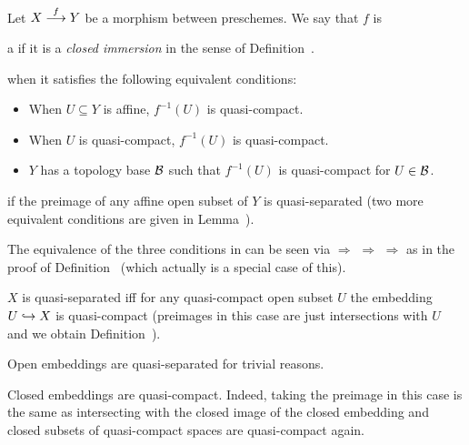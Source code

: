 \documentclass[a4paper,parskip=half,numbers=enddot, DIV=12]{scrreprt}
\begin{document}
\begin{defi}
    Let $X\morphism[f] Y$ be a morphism between preschemes. We say that $f$ is
    \begin{alphanumerate}
        \item
            a  if it is a \emph{closed immersion} in the sense of Definition~.
        \item 
             when it satisfies the following equivalent conditions:
            \begin{itemize}
              \item[\itememph{\alpha}]
                When $U\subseteq Y$ is affine, $f^{-1}(U)$ is quasi-compact.
              \item[\itememph{\beta}]
                When $U$ is quasi-compact, $f^{-1}(U)$ is quasi-compact.
              \item[\itememph{\gamma}]
                $Y$ has a topology base $\mathcal{B}$ such that $f^{-1}(U)$ is quasi-compact for $U\in \mathcal{B}$.
            \end{itemize}
        \item 
             if the preimage of any affine open subset of $Y$ is quasi-separated (two more equivalent conditions are given in Lemma~).
    \end{alphanumerate}
\end{defi}
\begin{rem}
    \begin{alphanumerate}
        \item {}
            The equivalence of the three conditions in  can be seen via \itememph{\beta} $\Rightarrow$ \itememph{\alpha} $\Rightarrow$ \itememph{\gamma} $\Rightarrow$ \itememph{\beta} as in the proof of Definition~ (which actually is a special case of this). 
        \item 
            $X$ is quasi-separated iff for any quasi-compact open subset $U$ the embedding $U\monomorphism X$ is quasi-compact (preimages in this case are just intersections with $U$ and we obtain Definition~).
        \item 
            Open embeddings are quasi-separated for trivial reasons.
        \item
	        Closed embeddings are quasi-compact. Indeed, taking the preimage in this case is the same as intersecting with the closed image of the closed embedding and closed subsets of quasi-compact spaces are quasi-compact again.
    \end{alphanumerate}
\end{rem}
\end{document}
